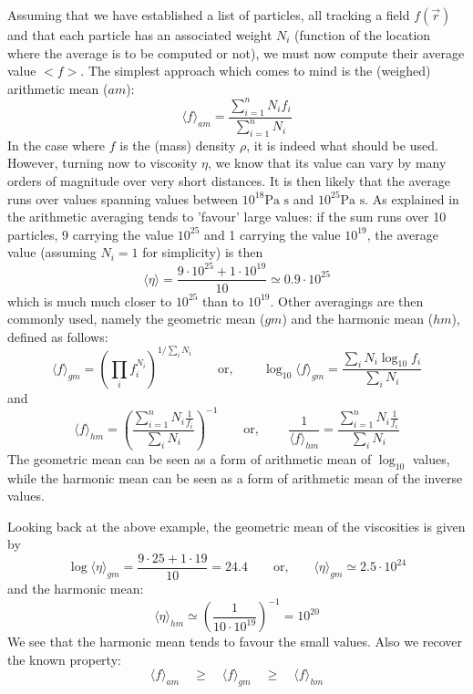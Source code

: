 
Assuming that we have established a list of particles, all tracking a field $f(\vec r)$ and that each particle has an 
associated weight $N_i$ (function of the location where the average is to be computed or not), 
we must now compute their average value $<f>$. 
The simplest approach which comes to mind is the (weighed) arithmetic mean ($am$):
\[
\langle f\rangle_{am} = \frac{\sum\limits_{i=1}^n N_i f_i}{\sum\limits_{i=1}^n N_i}
\]  
In the case where $f$ is the (mass) density $\rho$, it is indeed what should be used. 
However, turning now to viscosity $\eta$, we know that its value can vary by many orders of magnitude 
over very short distances.
It is then likely that the average runs over values spanning values between $10^{18}\text{Pa s}$ and $10^{25} \text{Pa s}$.
As explained in \cite{scbe08} the arithmetic averaging tends to 'favour' large values: if the sum runs over 
10 particles, 9 carrying the value $10^{25}$ and 1 carrying the value $10^{19}$, the average value (assuming $N_i=1$ for simplicity)
is then
\[
\langle\eta\rangle = \frac{9\cdot 10^{25}+1\cdot 10^{19}}{10} \simeq 0.9\cdot 10^{25}
\]
which is much much closer to $10^{25}$ than to $10^{19}$.
Other averagings are then commonly used, namely the geometric mean ($gm$)  and the harmonic mean ($hm$), defined as follows:
\[
\langle f\rangle_{gm} = \left( \prod_i f_i^{N_i} \right)^{1/\sum\limits_i N_i} 
\qquad
\text{or, }
\qquad
\log_{10} \langle f \rangle_{gm} = \frac{\sum_i N_i \log_{10} f_i }{\sum\limits_i N_i}  
\]
and 
\[
\langle f\rangle_{hm} = \left( \frac{\sum_{i=1}^n N_i \frac{1}{f_i} }{\sum_i N_i}  \right)^{-1}
\qquad
\text{or, }
\qquad
\frac{1}{\langle f\rangle_{hm} } = \frac{\sum_{i=1}^n N_i \frac{1}{f_i} }{\sum_i N_i}  
\]
The geometric mean can be seen as a form of arithmetic mean of $\log_{10}$ values, while the harmonic mean can be seen as 
a form of arithmetic mean of the inverse values.

Looking back at the above example, the geometric mean of the viscosities is given by 
\[
\log \langle \eta\rangle_{gm} = \frac{9\cdot 25+1\cdot 19}{10} = 24.4 
\qquad \text{or,} \qquad 
\langle \eta\rangle_{gm} \simeq 2.5 \cdot 10^{24}
\]
and the harmonic mean:
\[
\langle\eta\rangle_{hm} \simeq \left( \frac{1}{10 \cdot  10^{19}} \right)^{-1} = 10^{20}
\]
We see that the harmonic mean tends to favour the small values. Also we recover the known property:
\begin{equation}
\langle f \rangle_{am}\quad  \geq \quad
\langle f \rangle_{gm}\quad  \geq \quad
\langle f \rangle_{hm} 
\end{equation}



